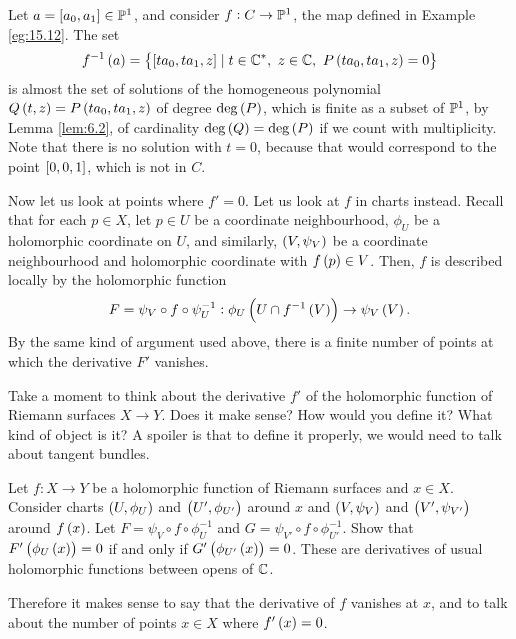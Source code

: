 \begin{example}
Let $ a = \sbr{a_0, a_1} \in \P^1 $, and consider $ f : C \to \P^1 $, the map defined in Example \ref{eg:15.12}. The set
$$ f^{-1}\br{a} = \cbr{\sbr{ta_0, ta_1, z} \mid t \in \C^*, \ z \in \C, \ P\br{ta_0, ta_1, z} = 0} $$
is almost the set of solutions of the homogeneous polynomial $ Q\br{t, z} = P\br{ta_0, ta_1, z} $ of degree $ \deg\br{P} $, which is finite as a subset of $ \P^1 $, by Lemma \ref{lem:6.2}, of cardinality $ \deg\br{Q} = \deg\br{P} $ if we count with multiplicity. Note that there is no solution with $ t = 0 $, because that would correspond to the point $ \sbr{0, 0, 1} $, which is not in $ C $.
\end{example}

Now let us look at points where $ f' = 0 $. Let us look at $ f $ in charts instead. Recall that for each $ p \in X $, let $ p \in U $ be a coordinate neighbourhood, $ \phi_U $ be a holomorphic coordinate on $ U $, and similarly, $ \br{V, \psi_V} $ be a coordinate neighbourhood and holomorphic coordinate with $ f\br{p} \in V $. Then, $ f $ is described locally by the holomorphic function
$$ F = \psi_V \circ f \circ \psi_U^{-1} : \phi_U\br{U \cap f^{-1}\br{V}} \to \psi_V\br{V}. $$
By the same kind of argument used above, there is a finite number of points at which the derivative $ F' $ vanishes.

\begin{exercise}
Take a moment to think about the derivative $ f' $ of the holomorphic function of Riemann surfaces $ X \to Y $. Does it make sense? How would you define it? What kind of object is it? A spoiler is that to define it properly, we would need to talk about tangent bundles.
\end{exercise}

\begin{exercise}
Let $ f : X \to Y $ be a holomorphic function of Riemann surfaces and $ x \in X $. Consider charts $ \br{U, \phi_U} $ and $ \br{U', \phi_{U'}} $ around $ x $ and $ \br{V, \psi_V} $ and $ \br{V', \psi_{V'}} $ around $ f\br{x} $. Let $ F = \psi_V \circ f \circ \phi_U^{-1} $ and $ G = \psi_{V'} \circ f \circ \phi_{U'}^{-1} $. Show that $ F'\br{\phi_U\br{x}} = 0 $ if and only if $ G'\br{\phi_{U'}\br{x}} = 0 $. These are derivatives of usual holomorphic functions between opens of $ \C $.
\end{exercise}

Therefore it makes sense to say that the derivative of $ f $ vanishes at $ x $, and to talk about the number of points $ x \in X $ where $ f'\br{x} = 0 $.

